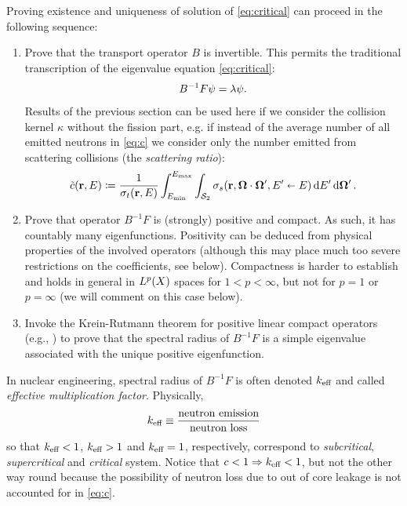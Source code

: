 Proving existence and uniqueness of solution of \eqref{eq:critical} can proceed in the following sequence:
\begin{enumerate}
	\item
		Prove that the transport operator $B$ is invertible. This permits the traditional transcription of the  eigenvalue
		equation \eqref{eq:critical}:
		$$
		B^{-1}F\psi = \lambda\psi.
		$$
		Results of the previous section can be used here if we consider the collision kernel $\kappa$ without the fission
		part, e.g. if instead of the average number of all emitted neutrons in \eqref{eq:c} we consider only the number
		emitted from scattering collisions (the \textit{scattering ratio}):
		\begin{equation}\label{eq:tildec}
		\tilde c(\mathbf{r},E) \coloneqq \frac{1}{\sigma_t(\mathbf{r},E)}\int_{E_{\text{min}}}^{E_{\text{max}}}\int_{\mathcal{S}_2}
		\sigma_s(\mathbf{r},\mathbf{\Omega}\cdot\mathbf{\Omega}', E'\shortleftarrow E)\,\text{d}E'\,\text{d}\mathbf{\Omega}'\,.
	    \end{equation}
	\item
		Prove that operator $B^{-1}F$ is (strongly) positive and compact. As such, it has countably many eigenfunctions. 
		Positivity can be deduced from physical properties of the involved operators (although this may place much too severe
		restrictions on the coefficients, see below). Compactness is harder to establish and holds in general in $L^{p}(X)$
		spaces for $1 < p < \infty$, but not for $p = 1$ or $p = \infty$ (we will comment on this case below).
	\item
		Invoke the Krein-Rutmann theorem for positive linear compact operators (e.g., \cite[Thm. 5.4.33]{DrabekNFA}) to prove
		that the spectral radius of $B^{-1}F$ is a simple eigenvalue associated with the unique positive eigenfunction.
\end{enumerate}
\begin{remark}\label{rem:keff}
In nuclear engineering, spectral radius of $B^{-1}F$ is often denoted $k_{\text{eff}}$
and called \textit{effective multiplication factor}. Physically,
$$
k_{\text{eff}} \equiv \frac{\mbox{neutron emission}}{\mbox{neutron loss}}
$$
so that 
$k_{\text{eff}} < 1$, $k_{\text{eff}} > 1$ and $k_{\text{eff}} = 1$, respectively, correspond to \textit{subcritical},
\textit{supercritical} and \textit{critical} system. Notice that $c < 1 \Rightarrow k_{\text{eff}} < 1$, but not the other way
round because the possibility of neutron loss due to out of core leakage is not accounted for in \eqref{eq:c}. 
%
\end{remark}

